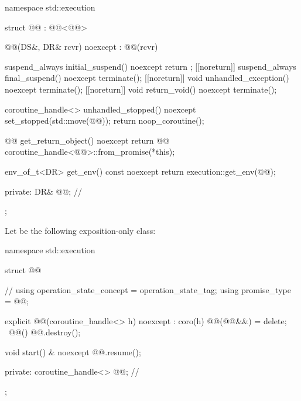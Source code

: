 \begin{codeblock}
namespace std::execution {
  struct @@ : @@<@@> {

    @@(DS&, DR& rcvr) noexcept : @@(rcvr) {}

    suspend_always initial_suspend() noexcept { return {}; }
    [[noreturn]] suspend_always final_suspend() noexcept { terminate(); }
    [[noreturn]] void unhandled_exception() noexcept { terminate(); }
    [[noreturn]] void return_void() noexcept { terminate(); }

    coroutine_handle<> unhandled_stopped() noexcept {
      set_stopped(std::move(@@));
      return noop_coroutine();
    }

    @@ get_return_object() noexcept {
      return @@{
        coroutine_handle<@@>::from_promise(*this)};
    }

    env_of_t<DR> get_env() const noexcept {
      return execution::get_env(@@);
    }

  private:
    DR& @@;                           // \expos
  };
}
\end{codeblock}

\pnum
Let  be the following exposition-only class:
\begin{codeblock}
namespace std::execution {
  struct @@ {                              // \expos
    using operation_state_concept = operation_state_tag;
    using promise_type = @@;

    explicit @@(coroutine_handle<> h) noexcept : coro(h) {}
    @@(@@&&) = delete;
    ~@@() { @@.destroy(); }

    void start() & noexcept {
      @@.resume();
    }

  private:
    coroutine_handle<> @@;                                    // \expos
  };
}
\end{codeblock}

